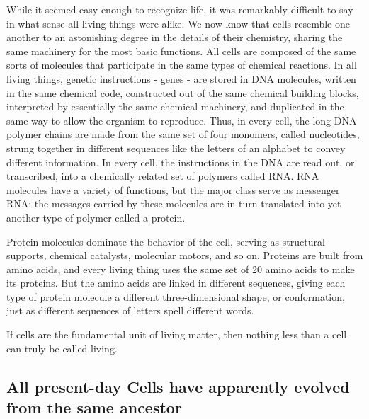 While it seemed easy enough to recognize life, it was remarkably difficult to
say in what sense all living things were alike.
We now know that cells resemble one another to an astonishing
degree in the details of their chemistry, sharing the same machinery
for the most basic functions. All cells are composed of the same sorts of
molecules that participate in the same types of chemical reactions.
In all living things, genetic instructions - genes - are
stored in DNA molecules, written in the same chemical code, constructed
out of the same chemical building blocks, interpreted by essentially the
same chemical machinery, and duplicated in the same way to allow the
organism to reproduce. Thus, in every cell, the long DNA polymer chains
are made from the same set of four monomers, called nucleotides, strung
together in different sequences like the letters of an alphabet to convey
different information. In every cell, the instructions in the DNA are read
out, or transcribed, into a chemically related set of polymers called RNA.
RNA molecules have a variety of functions, but the major
class serve as messenger RNA: the messages carried by these molecules
are in turn translated into yet another type of polymer called a protein.

Protein molecules dominate the behavior of the cell, serving as structural
supports, chemical catalysts, molecular motors, and so on. Proteins
are built from amino acids, and every living thing uses the same set of
20 amino acids to make its proteins. But the amino acids are linked in
different sequences, giving each type of protein molecule a different
three-dimensional shape, or conformation, just as different sequences
of letters spell different words.

If cells are the fundamental unit of living matter, then nothing less than a
cell can truly be called living.

\subsection{All present-day Cells have apparently evolved from the same ancestor}

